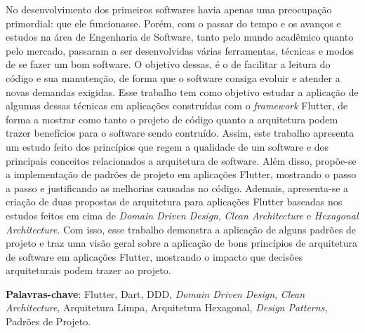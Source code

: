 \documentclass[12pt, %
openright, 
oneside, %
a4paper,    %
brazil]{facom-ufu-abntex2}
\begin{document}
\begin{resumo}
    No desenvolvimento dos primeiros softwares havia apenas uma preocupação primordial: que ele funcionasse. Porém, com o passar do tempo e os avanços e estudos na área de Engenharia de Software, tanto pelo mundo acadêmico quanto pelo mercado, passaram a ser desenvolvidas várias ferramentas, técnicas e modos de se fazer um bom software. O objetivo dessas, é o de facilitar a leitura do código e sua manutenção, de forma que o software consiga evoluir e atender a novas demandas exigidas. Esse trabalho tem como objetivo estudar a aplicação de algumas dessas técnicas em aplicações construídas com o \textit{framework} Flutter, de forma a mostrar como tanto o projeto de código quanto a arquitetura podem trazer benefícios para o software sendo contruído. Assim, este trabalho apresenta um estudo feito dos princípios que regem a qualidade de um software e dos principais conceitos relacionados a arquitetura de software. Além disso, propõe-se a implementação de padrões de projeto em aplicações Flutter, mostrando o passo a passo e justificando as melhorias causadas no código. Ademais, apresenta-se a criação de duas propostas de arquitetura para aplicações Flutter baseadas nos estudos feitos em cima de \textit{Domain Driven Design}, \textit{Clean Architecture} e \textit{Hexagonal Architecture}. Com isso, esse trabalho demonstra a aplicação de alguns padrões de projeto e traz uma visão geral sobre a aplicação de bons princípios de arquitetura de software em aplicações Flutter, mostrando o impacto que decisões arquiteturais podem trazer ao projeto.

    \vspace{\onelineskip}
    \noindent
    \textbf{Palavras-chave}: Flutter, Dart, DDD, \textit{Domain Driven Design}, \textit{Clean Architecture}, Arquitetura Limpa, Arquitetura Hexagonal, \textit{Design Patterns}, Padrões de Projeto.
\end{resumo}

\listoffigures*
\cleardoublepage

\end{document}
